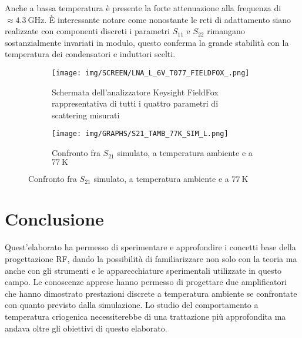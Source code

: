 \documentclass[12pt,oneside]{book}
\begin{document}
Anche a bassa temperatura è presente la forte attenuazione alla frequenza di $\approx\SI{4.3}{\giga\hertz}$. È interessante notare come nonostante le reti di adattamento siano realizzate con componenti discreti i parametri $S_{11}$ e $S_{22}$ rimangano sostanzialmente invariati in modulo, questo conferma la grande stabilità con la temperatura dei condensatori e induttori scelti.

\begin{figure}[!htbp]
    \centering
        \begin{subfigure}[t]{0.48\textwidth}
        \centering
        \texttt{[image: img/SCREEN/LNA\_L\_6V\_T077\_FIELDFOX\_.png]}
        \caption{Schermata dell'analizzatore Keysight FieldFox rappresentativa di tutti i quattro parametri di scattering misurati}
    \end{subfigure}
    \hfill
    \begin{subfigure}[t]{0.48\textwidth}
        \centering
        \texttt{[image: img/GRAPHS/S21\_TAMB\_77K\_SIM\_L.png]}
        \caption{Confronto fra $S_{21}$ simulato, a temperatura ambiente e a $\SI{77}{\kelvin}$}
    \end{subfigure}
    \hfill
\end{figure}


\chapter{Conclusione}
Quest'elaborato ha permesso di sperimentare e approfondire i concetti base della progettazione RF, dando la possibilità di familiarizzare non solo con la teoria ma anche con gli strumenti e le apparecchiature sperimentali utilizzate in questo campo.
Le conoscenze apprese hanno permesso di progettare due amplificatori che hanno dimostrato prestazioni discrete a temperatura ambiente se confrontate con quanto previsto dalla simulazione. Lo studio del comportamento a temperatura criogenica necessiterebbe di una trattazione più approfondita ma andava oltre gli obiettivi di questo elaborato.



\nocite{*}

\end{document}
